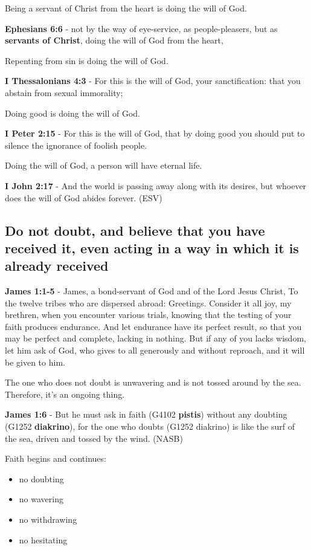 \documentclass[11pt]{article}
\begin{document}
Being a servant of Christ from the heart is doing the will of God.

\textbf{Ephesians 6:6} - not by the way of eye-service, as people-pleasers, but as \textbf{servants of Christ}, doing the will of God from the heart,

Repenting from sin is doing the will of God.

\textbf{I Thessalonians 4:3} - For this is the will of God, your sanctification: that you abstain from sexual immorality;

Doing good is doing the will of God.

\textbf{I Peter 2:15} - For this is the will of God, that by doing good you should put to silence the ignorance of foolish people.

Doing the will of God, a person will have eternal life.

\textbf{I John 2:17} - And the world is passing away along with its desires, but whoever does the will of God abides forever. (ESV)

\subsection{Do not doubt, and believe that you have received it, even acting in a way in which it is already received}
\label{sec:org6625f4c}
\textbf{James 1:1-5} - James, a bond-servant of God and of the Lord Jesus Christ, To the twelve tribes who are dispersed abroad: Greetings.  Consider it all joy, my brethren, when you encounter various trials, knowing that the testing of your faith produces endurance.  And let endurance have its perfect result, so that you may be perfect and complete, lacking in nothing.  But if any of you lacks wisdom, let him ask of God, who gives to all generously and without reproach, and it will be given to him.

The one who does not doubt is unwavering and is not tossed around by the sea.
Therefore, it's an ongoing thing.

\textbf{James 1:6} - But he must ask in faith (G4102 \textbf{pistis}) without any doubting (G1252 \textbf{diakrino}), for the one who doubts (G1252 diakrino) is like the surf of the sea, driven and tossed by the wind. (NASB)

Faith begins and continues:
\begin{itemize}
\item no doubting
\item no wavering
\item no withdrawing
\item no hesitating
\end{itemize}
\end{document}
